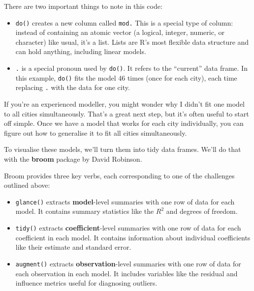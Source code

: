 There are two important things to note in this code:

\begin{itemize}
\item
  \texttt{do()} creates a new column called \texttt{mod.} This is a
  special type of column: instead of containing an atomic vector (a
  logical, integer, numeric, or character) like usual, it's a list.
  Lists are R's most flexible data structure and can hold anything,
  including linear models.
\item
  \texttt{.} is a special pronoun used by \texttt{do()}. It refers to
  the ``current'' data frame. In this example, \texttt{do()} fits the
  model 46 times (once for each city), each time replacing \texttt{.}
  with the data for one city. 
\end{itemize}

If you're an experienced modeller, you might wonder why I didn't fit one
model to all cities simultaneously. That's a great next step, but it's
often useful to start off simple. Once we have a model that works for
each city individually, you can figure out how to generalise it to fit
all cities simultaneously.

To visualise these models, we'll turn them into tidy data frames. We'll
do that with the \textbf{broom} package by David Robinson. 
 

\begin{Shaded}
\begin{Highlighting}[]
\end{Highlighting}
\end{Shaded}

Broom provides three key verbs, each corresponding to one of the
challenges outlined above:

\begin{itemize}
\item
  \texttt{glance()} extracts \textbf{model}-level summaries with one row
  of data for each model. It contains summary statistics like the
  \(R^2\) and degrees of freedom.
\item
  \texttt{tidy()} extracts \textbf{coefficient}-level summaries with one
  row of data for each coefficient in each model. It contains
  information about individual coefficients like their estimate and
  standard error.
\item
  \texttt{augment()} extracts \textbf{observation}-level summaries with
  one row of data for each observation in each model. It includes
  variables like the residual and influence metrics useful for
  diagnosing outliers.
\end{itemize}

